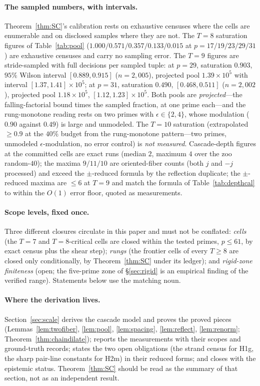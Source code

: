 \documentclass[11pt,a4paper]{article}
\numberwithin{equation}{section}
\theoremstyle{plain}
\theoremstyle{definition}
\theoremstyle{remark}
\begin{document}
\paragraph{The sampled numbers, with intervals.}
Theorem~\ref{thm:SC}'s calibration rests on exhaustive censuses where
the cells are enumerable and on disclosed samples where they are not.
The $T=8$ saturation figures of Table~\ref{tab:pool}
($1.000/0.571/0.357/0.133/0.015$ at $p=17/19/23/29/31$) are exhaustive
censuses and carry no sampling error. The $T=9$ figures are
stride-sampled with full decisions per sampled tuple: at $p=29$,
saturation $0.903$, $95\%$ Wilson interval $[0.889,0.915]$
($n=2{,}005$), projected pool $1.39\times10^5$ with interval
$[1.37,1.41]\times10^5$; at $p=31$, saturation $0.490$,
$[0.468,0.511]$ ($n=2{,}002$), projected pool $1.18\times10^5$,
$[1.12,1.23]\times10^5$. Both pools are \emph{projected}---the
falling-factorial bound times the sampled fraction, at one prime
each---and the rung-monotone reading rests on two primes with
$\epsilon\in\{2,4\}$, whose modulation ($0.90$ against $0.49$) is large
and unmodeled. The $T=10$ saturation (extrapolated $\ge 0.9$ at the
$40\%$ budget from the rung-monotone pattern---two primes, unmodeled
$\epsilon$-modulation, no error control) is \emph{not measured}. Cascade-depth figures at the
committed cells are exact runs (median $2$, maximum $4$ over the zoo
random-$40$); the maxima $9/11/10$ are oriented-fiber counts (both $j$
and $-j$ processed) and exceed the $\pm$-reduced formula by the reflection
duplicate; the $\pm$-reduced maxima are $\le 6$ at $T=9$ and match the
formula of Table~\ref{tab:depthcal} to within the $O(1)$ error floor,
quoted as measurements.

\paragraph{Scope levels, fixed once.}
Three different closures circulate in this paper and must not be
conflated: \emph{cells} (the $T=7$ and $T=8$-critical cells are closed
within the tested primes, $p\le 61$, by exact census plus the shear
step); \emph{rungs} (the frontier cells of every $T\ge 8$ are closed
only conditionally, by Theorem~\ref{thm:SC} under its ledger); and
\emph{rigid-zone finiteness} (open; the five-prime zone of
\S\ref{sec:rigid} is an empirical finding of the verified range).
Statements below use the matching noun.

\paragraph{Where the derivation lives.}
Section~\ref{sec:scale} derives the cascade model and proves the proved
pieces (Lemmas~\ref{lem:twofiber}, \ref{lem:pool}, \ref{lem:spacing},
\ref{lem:reflect}, \ref{lem:renorm}; Theorem~\ref{thm:chaindilate});
reports the measurements with their scopes and ground-truth records;
states the two open obligations (the strand census for H1g, the sharp
pair-line constants for H2m) in their reduced forms; and closes with
the epistemic status. Theorem~\ref{thm:SC} should be read as the
summary of that section, not as an independent result.
\end{document}
